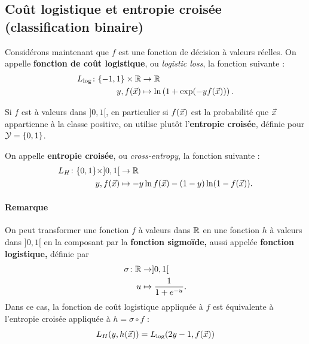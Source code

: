 \subsection{Coût logistique et entropie croisée (classification binaire)}
Considérons maintenant que $f$ est une fonction de décision à valeurs réelles.
\label{sec:logistic_loss}
On appelle \textbf{fonction de coût logistique}, ou {\it logistic loss}, la
fonction suivante :
\begin{equation}
  \begin{split}
  L_{\log}\colon\mopo \times \RR & \to \RR \\ 
  y, f(\xx) & \mapsto \ln \left( 1 + \exp(-y f(\xx))\right). 
\end{split}
  \label{eq:logistic_loss}
\end{equation}

Si $f$ est à valeurs dans $]0, 1[$, en particulier si $f(\xx)$ est la
probabilité que $\xx$ appartienne à la classe positive, %
on utilise plutôt
l'\textbf{entropie croisée}, définie pour $\mathcal{Y} = \lbrace 0, 1 \rbrace$.

\label{sec:cross_entropy}
On appelle \textbf{entropie croisée}, ou {\it cross-entropy},
la fonction suivante :
\begin{equation}
  \begin{split}
    L_H \colon \zo \times ]0, 1[ & \to \RR \\
    y, f(\xx) & \mapsto - y \ln f(\xx) - (1-y) \ln(1-f(\xx)).
  \end{split}
  \label{eq:cross_entropy}
\end{equation}

\paragraph{Remarque} On peut transformer une fonction $f$ à valeurs dans $\mathbb{R}$
en une fonction $h$ à valeurs dans $]0, 1[$ en la composant par la
\textbf{fonction sigmoïde,} aussi appelée \textbf{fonction logistique,} définie
par
\begin{equation}
  \label{eq:sigmoide}
  \begin{split}
    \sigma \colon \mathbb{R} & \to ]0, 1[ \\
    u & \mapsto \frac1{1 + e^{-u}}.
  \end{split}
\end{equation}
Dans ce cas, la fonction de coût logistique appliquée à $f$ est équivalente à
l'entropie croisée appliquée à $h = \sigma \circ f$ :
\[
  L_H(y, h(\xx)) = L_{\log} (2y-1, f(\xx))
\]

